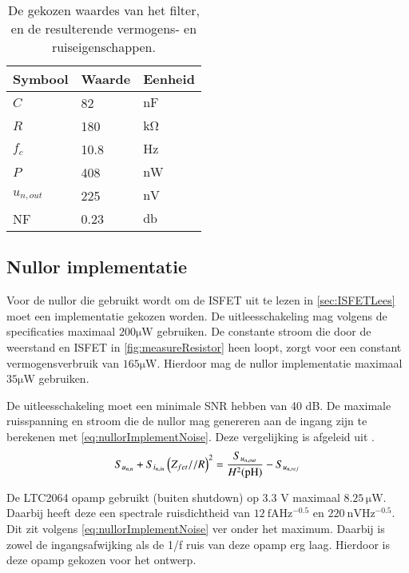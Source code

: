 \begin{table}[ht]
    \centering
    \begin{tabular}{l|l|l}
        Symbool & Waarde & Eenheid \\
        \hline
        $C$         & 82    & $\si{\nano\farad}$\\
        $R$         & 180   & $\si{\kilo\ohm}$  \\
        $f_c$       & 10.8  & $\si{\hertz}$     \\
        $P$         & 408   & $\si{\nano\watt}$ \\
        $u_{n,out}$ & 225   & $\si{\nano\volt}$ \\
        NF          & 0.23  & $\si{\decibel}$   \\
    \end{tabular}
    \caption{De gekozen waardes van het filter, en de resulterende vermogens- en ruiseigenschappen.}
    \label{tab:filterValues}
\end{table}


\subsection{Nullor implementatie}
Voor de nullor die gebruikt wordt om de ISFET uit te lezen in \cref{sec:ISFETLees} moet een implementatie gekozen worden. De uitleesschakeling mag volgens de specificaties maximaal $200 \si{\micro\watt}$  gebruiken. De constante stroom die door de weerstand en ISFET in \cref{fig:measureResistor} heen loopt, zorgt voor een constant vermogensverbruik van $165 \si{\micro\watt}$. Hierdoor mag de nullor implementatie maximaal $35 \si{\micro\watt}$ gebruiken.

De uitleesschakeling moet een minimale SNR hebben van 40 dB. De maximale ruisspanning en stroom die de nullor mag genereren aan de ingang zijn te berekenen met \cref{eq:nullorImplementNoise}. Deze vergelijking is afgeleid uit .
\begin{equation} \label{eq:nullorImplementNoise} 
    S_{u_{{n,n}}} + S_{i_{{n,in}}}\left(Z_{fet} // R\right)^2 = \frac{S_{u_{{n,out}}}}{H^2(\mathrm{pH})} - S_{u_{{n,ref}}}
\end{equation}

De LTC2064 opamp gebruikt (buiten shutdown) op 3.3 V maximaal $8.25\,\si{\micro\watt}$. Daarbij heeft deze een spectrale ruisdichtheid van $\qty{12}{\femto\ampere\hertz^{-0.5}}$ en $\qty{220}{\nano\volt\hertz^{-0.5}}$\cite{LTC2064}. Dit zit volgens \cref{eq:nullorImplementNoise} ver onder het maximum. Daarbij is zowel de ingangsafwijking als de 1/f ruis van deze opamp erg laag. Hierdoor is deze opamp gekozen voor het ontwerp.

